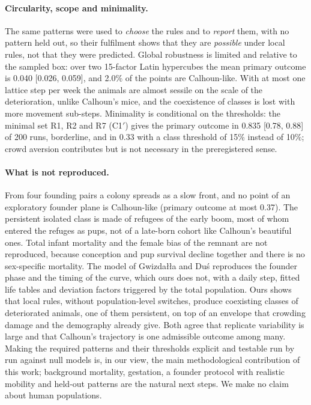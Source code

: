 \paragraph*{Circularity, scope and minimality.}
The same patterns were used to \emph{choose} the rules and to \emph{report} them, with no pattern held out, so their
fulfilment shows that they are \emph{possible} under local rules, not that they were predicted. Global robustness
is limited and relative to the sampled box: over two 15-factor Latin hypercubes the mean primary outcome is 0.040
[0.026, 0.059], and 2.0\% of the points are Calhoun-like. With at most one lattice step per week the animals are
almost sessile on the scale of the deterioration, unlike Calhoun's mice, and the coexistence of classes is lost with
more movement sub-steps. Minimality is conditional on the thresholds: the minimal set R1, R2 and R7 (\textsf{C1}$'$)
gives the primary outcome in 0.835 [0.78, 0.88] of 200 runs, borderline, and in 0.33 with a class threshold of 15\%
instead of 10\%; crowd aversion contributes but is not necessary in the preregistered sense.

\paragraph*{What is not reproduced.}
From four founding pairs a colony spreads as a slow front, and no point of an exploratory founder plane is
Calhoun-like (primary outcome at most 0.37). The persistent isolated class is made of refugees of the early boom,
most of whom entered the refuges as pups, not of a late-born cohort like Calhoun's beautiful ones. Total infant
mortality and the female bias of the remnant are not reproduced, because conception and pup survival decline
together and there is no sex-specific mortality. The model of Gwizdałła and Duś \cite{GwizdallaDus2026} reproduces
the founder phase and the timing of the curve, which ours does not, with a daily step, fitted life tables and
deviation factors triggered by the total population. Ours shows that local rules, without population-level
switches, produce coexisting classes of deteriorated animals, one of them persistent, on top of an envelope that
crowding damage and the demography already give. Both agree that replicate variability is large and that Calhoun's
trajectory is one admissible outcome among many. Making the required patterns and their thresholds explicit and
testable run by run against null models is, in our view, the main methodological contribution of this work;
background mortality, gestation, a founder protocol with realistic mobility and held-out patterns are the natural
next steps. We make no claim about human populations.
